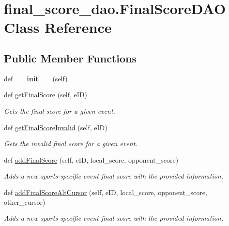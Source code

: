 \hypertarget{classfinal__score__dao_1_1_final_score_d_a_o}{}\section{final\+\_\+score\+\_\+dao.\+Final\+Score\+D\+AO Class Reference}
\label{classfinal__score__dao_1_1_final_score_d_a_o}
\subsection*{Public Member Functions}
\begin{DoxyCompactItemize}
\item 
\mbox{\label{classfinal__score__dao_1_1_final_score_d_a_o_ac0fa2a9ac04c4b903ce2a3e03b05e6d6}} 
def {\bfseries \+\_\+\+\_\+init\+\_\+\+\_\+} (self)
\item 
def \hyperlink{classfinal__score__dao_1_1_final_score_d_a_o_a63acb3f4dbb9e962257c8872f655008c}{get\+Final\+Score} (self, e\+ID)
\begin{DoxyCompactList}\small\item\em Gets the final score for a given event. \end{DoxyCompactList}\item 
def \hyperlink{classfinal__score__dao_1_1_final_score_d_a_o_a13bd4ead23ef2fc2b427eee2983eb66a}{get\+Final\+Score\+Invalid} (self, e\+ID)
\begin{DoxyCompactList}\small\item\em Gets the invalid final score for a given event. \end{DoxyCompactList}\item 
def \hyperlink{classfinal__score__dao_1_1_final_score_d_a_o_a7126025cd250de927c8b75186a150e0c}{add\+Final\+Score} (self, e\+ID, local\+\_\+score, opponent\+\_\+score)
\begin{DoxyCompactList}\small\item\em Adds a new sports-\/specific event final score with the provided information. \end{DoxyCompactList}\item 
def \hyperlink{classfinal__score__dao_1_1_final_score_d_a_o_a19d668578bb9e02d0f5fdd27ed93a6b5}{add\+Final\+Score\+Alt\+Cursor} (self, e\+ID, local\+\_\+score, opponent\+\_\+score, other\+\_\+cursor)
\begin{DoxyCompactList}\small\item\em Adds a new sports-\/specific event final score with the provided information. \end{DoxyCompactList}\item 

\end{DoxyCompactItemize}
